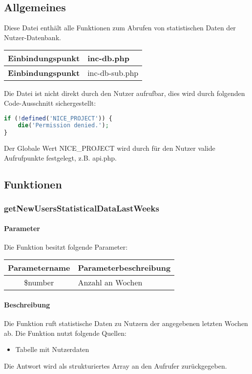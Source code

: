 \subsection{Allgemeines} Diese Datei enthält alle Funktionen zum Abrufen von statistischen Daten der Nutzer-Datenbank.
\begin{table}[H]
	\begin{tabular}{|c|p{11cm}|}
		\hline
		\textbf{Einbindungspunkt} & inc-db.php \\ \hline
		\textbf{Einbindungspunkt} & inc-db-sub.php \\ \hline
	\end{tabular}
\end{table}
Die Datei ist nicht direkt durch den Nutzer aufrufbar, dies wird durch folgenden Code-Ausschnitt sichergestellt:
\begin{lstlisting}[language=php]
if (!defined('NICE_PROJECT')) {
	die('Permission denied.');
}
\end{lstlisting}
Der Globale Wert {\glqq NICE\_PROJECT\grqq} wird durch für den Nutzer valide Aufrufpunkte festgelegt, z.B. {\glqq api.php\grqq}.
\newpage
\subsection{Funktionen}
\subsubsection{getNewUsersStatisticalDataLastWeeks}
\paragraph{Parameter} Die Funktion besitzt folgende Parameter:
\begin{table}[H]
	\begin{tabular}{|c|p{11cm}|}
		\hline
		\textbf{Parametername} & \textbf{Parameterbeschreibung} \\ \hline
		\$number & Anzahl an Wochen \\ \hline
	\end{tabular}
\end{table}
\paragraph{Beschreibung} Die Funktion ruft statistische Daten zu Nutzern der angegebenen letzten Wochen ab. Die Funktion nutzt folgende Quellen:
\begin{itemize}
	\item Tabelle mit Nutzerdaten
\end{itemize}
Die Antwort wird als strukturiertes Array an den Aufrufer zurückgegeben.

